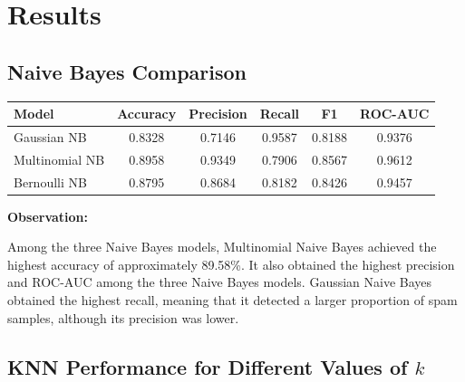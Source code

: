 \documentclass[12pt,a4paper]{article}
\begin{document}

\section{Results}

\subsection{Naive Bayes Comparison}

\begin{longtable}{|p{3.5cm}|c|c|c|c|c|}
\hline
\textbf{Model} &
\textbf{Accuracy} &
\textbf{Precision} &
\textbf{Recall} &
\textbf{F1} &
\textbf{ROC-AUC} \\ \hline

Gaussian NB &
0.8328 &
0.7146 &
0.9587 &
0.8188 &
0.9376 \\ \hline

Multinomial NB &
0.8958 &
0.9349 &
0.7906 &
0.8567 &
0.9612 \\ \hline

Bernoulli NB &
0.8795 &
0.8684 &
0.8182 &
0.8426 &
0.9457 \\ \hline

\end{longtable}

\textbf{Observation:}

Among the three Naive Bayes models, Multinomial Naive Bayes achieved the highest accuracy of approximately 89.58\%. It also obtained the highest precision and ROC-AUC among the three Naive Bayes models. Gaussian Naive Bayes obtained the highest recall, meaning that it detected a larger proportion of spam samples, although its precision was lower.


\subsection{KNN Performance for Different Values of $k$}
\end{document}
